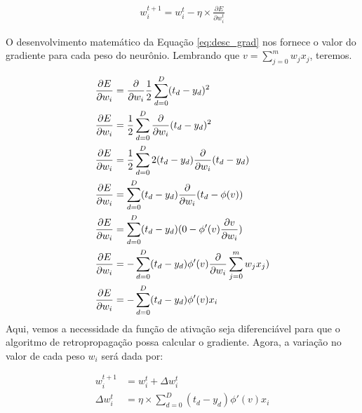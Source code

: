 \begin{equation}
\label{eq:desc_grad}
\begin{aligned}
w_{i}^{t+1} = w_{i}^{t} - \eta \times \frac{\partial E}{\partial w^{t}_{i}}
\end{aligned}
\end{equation}

O desenvolvimento matemático da Equação \ref{eq:desc_grad} nos fornece o valor do gradiente para cada peso do neurônio. Lembrando que $v = \sum_{j=0}^{m}w_{j}x_{j}$, teremos.

\begin{equation}
\begin{aligned}
\centering    
\displaystyle \frac{\partial E}{\partial w_{i}} &= \frac{\partial}{\partial w_{i}} \frac{1}{2}\sum_{d=0}^{D}( t_{d} - y_{d})^{2}  \\
\displaystyle \frac{\partial E}{\partial w_{i}} &=   \frac{1}{2}\sum_{d=0}^{D} \frac{\partial}{\partial w_{i}}(t_{d} - y_{d})^{2} \\
\displaystyle \frac{\partial E}{\partial w_{i}} &=  \frac{1}{2}\sum_{d=0}^{D} 2(t_{d} - y_{d}) \frac{\partial}{\partial w_{i}}(t_{d} - y_{d}) \\
\displaystyle \frac{\partial E}{\partial w_{i}} &= \sum_{d=0}^{D} (t_{d} - y_{d}) \frac{\partial}{\partial w_{i}}(t_{d} -  \phi(v) ) \\
\displaystyle \frac{\partial E}{\partial w_{i}} &= \sum_{d=0}^{D} (t_{d} - y_{d})(0 -  \phi'(v)\frac{\partial  v}{\partial w_{i}} ) \\
\displaystyle \frac{\partial E}{\partial w_{i}} &= -\sum_{d=0}^{D} (t_{d} - y_{d})\phi'(v)\frac{\partial}{\partial w_{i}}\sum_{j=0}^{m}w_{j}x_{j}  ) \\ 
\displaystyle \frac{\partial E}{\partial w_{i}} &= -\sum_{d=0}^{D} (t_{d} - y_{d})\phi'(v)x_{i} 
\end{aligned}
\end{equation}
Aqui, vemos a necessidade da função de ativação seja diferenciável para que o algoritmo de retropropagação possa calcular o gradiente. Agora, a variação no valor de cada peso $w_{i}$ será dada por:

\begin{equation}
\label{eq:descida_grad_neuronio}
\begin{aligned}
{w}^{t+1}_{i} &= {w}^{t}_{i} + \Delta {w}^{t}_{i}  \\     
\Delta{w}^{t}_{i} &=  \eta \times \sum_{d=0}^{D} (t_{d} - y_{d})\phi'(v)x_{i}
\end{aligned}
\end{equation}

